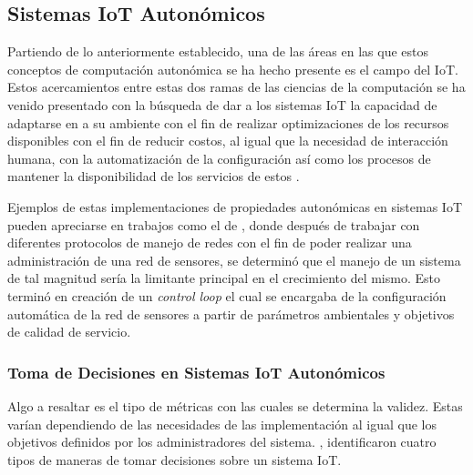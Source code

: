 \subsection{Sistemas IoT Autonómicos}

Partiendo de lo anteriormente establecido, una de las áreas en las que estos conceptos de computación autonómica se ha hecho presente es el campo del IoT. Estos acercamientos entre estas dos ramas de las ciencias de la computación se ha venido presentado con la búsqueda de dar a los sistemas IoT la capacidad de adaptarse en a su ambiente con el fin de realizar optimizaciones de los recursos disponibles con el fin de reducir costos, al igual que la necesidad de interacción humana, con la automatización de la configuración así como los procesos de mantener la disponibilidad de los servicios de estos \cite{Ashraf2023}.

Ejemplos de estas implementaciones de propiedades autonómicas en sistemas IoT pueden apreciarse en trabajos como el de \citeauthor{Rajan2011} \citeyear{Rajan2011}, donde después de trabajar con diferentes protocolos de manejo de redes con el fin de poder realizar una administración de una red de sensores, se determinó que el manejo de un sistema de tal magnitud sería la limitante principal en el crecimiento del mismo. Esto terminó en creación de un \textit{control loop} el cual se encargaba de la configuración automática de la red de sensores a partir de parámetros ambientales y objetivos de calidad de servicio.

\subsubsection{Toma de Decisiones en Sistemas IoT Autonómicos}

Algo a resaltar es el tipo de métricas con las cuales se determina la validez. Estas varían dependiendo de las necesidades de las implementación al igual que los objetivos definidos por los administradores del sistema. , identificaron cuatro tipos de maneras de tomar decisiones sobre un sistema IoT.

